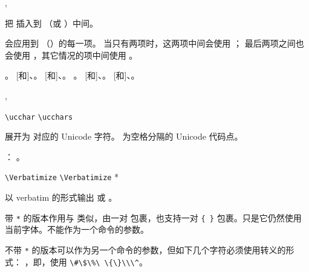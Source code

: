 \documentclass{cusdoc}
\begin{document}
\begin{function}[EXP]{\UseList,\UseClist}
  \begin{syntax}
    \V\UseList {} 
    \V\UseList {}   
    \V\UseClist {} 
    \V\UseClist {}   
  \end{syntax}
把  插入到 （或 ）中间。

 会应用到 （）的每一项。
当只有两项时，这两项中间会使用 ；
最后两项之间也会使用 ，其它情况的项中间使用 。
\end{function}

\begin{xample}
。
[和]{、}。
[和]{、}。
。
[和]{、}。
[和]{、}。
\stopxamplecode
\xampleprint
\end{xample}

\begin{function}[rEXP]{\ucchar,\ucchars}
  \begin{syntax}
    \verb|\ucchar|  
    \verb|\ucchars| 
  \end{syntax}
展开为  对应的 Unicode 字符。 为空格分隔的 
Unicode 代码点。
\end{function}

\begin{xample}
：%
。
\stopxamplecode 
\xampleprint
\end{xample}

\begin{function}{\Verbatimize}
  \begin{syntax}
    \verb|\Verbatimize|   
    \verb|\Verbatimize| *   
  \end{syntax}
以 verbatim 的形式输出  或 。

带 \verb|*| 的版本作用与  类似，由一对  包裹，也支持一对 \verb|{ }| 包裹。只是它仍然使用当前字体。不能作为一个命令的参数。

不带 \verb|*| 的版本可以作为另一个命令的参数，但如下几个字符必须使用转义的形式：
\texttt{\Verbatimize{\#\$\%\ \{\}\\\^}}，即，使用 \verb|\#\$\%\ \{\}\\\^|。
\end{function}
\end{document}
